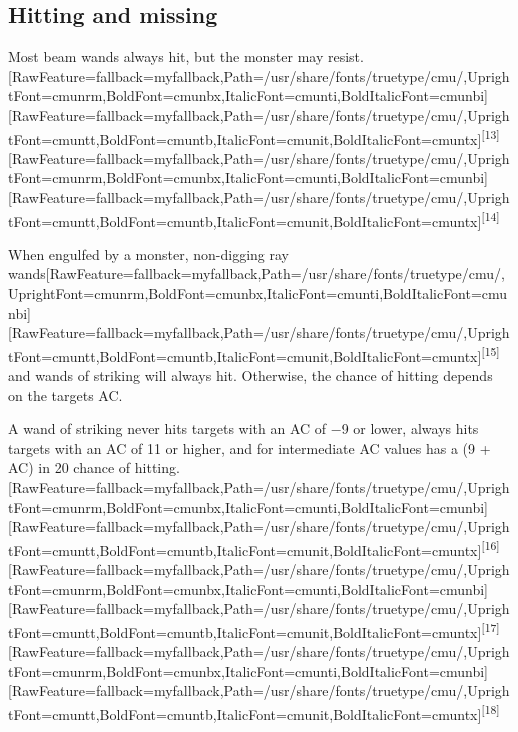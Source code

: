\subsection{Hitting and missing}
\label{6}
Most beam wands always hit, but the monster may resist.\allowbreak{}\setmainfont{cmunrm.ttf}[RawFeature={fallback=myfallback},Path=/usr/share/fonts/truetype/cmu/,UprightFont=cmunrm,BoldFont=cmunbx,ItalicFont=cmunti,BoldItalicFont=cmunbi]\setmonofont{cmunrm.ttf}[RawFeature={fallback=myfallback},Path=/usr/share/fonts/truetype/cmu/,UprightFont=cmuntt,BoldFont=cmuntb,ItalicFont=cmunit,BoldItalicFont=cmuntx]\textsuperscript{{$\text{[}$}13{$\text{]}$}}\allowbreak{}\setmainfont{cmunrm.ttf}[RawFeature={fallback=myfallback},Path=/usr/share/fonts/truetype/cmu/,UprightFont=cmunrm,BoldFont=cmunbx,ItalicFont=cmunti,BoldItalicFont=cmunbi]\setmonofont{cmunrm.ttf}[RawFeature={fallback=myfallback},Path=/usr/share/fonts/truetype/cmu/,UprightFont=cmuntt,BoldFont=cmuntb,ItalicFont=cmunit,BoldItalicFont=cmuntx]\textsuperscript{{$\text{[}$}14{$\text{]}$}}


When engulfed\footnotemark[87] by a monster, non-{}digging ray wands\allowbreak{}\setmainfont{cmunrm.ttf}[RawFeature={fallback=myfallback},Path=/usr/share/fonts/truetype/cmu/,UprightFont=cmunrm,BoldFont=cmunbx,ItalicFont=cmunti,BoldItalicFont=cmunbi]\setmonofont{cmunrm.ttf}[RawFeature={fallback=myfallback},Path=/usr/share/fonts/truetype/cmu/,UprightFont=cmuntt,BoldFont=cmuntb,ItalicFont=cmunit,BoldItalicFont=cmuntx]\textsuperscript{{$\text{[}$}15{$\text{]}$}} and wands of striking will always hit. Otherwise, the chance of hitting depends on the target\textquotesingle{}s AC.


A wand of striking never hits targets with an AC of {\mbox{$-$}}9 or lower, always hits targets with an AC of 11 or higher, and for intermediate AC values has a (9 + AC) in 20 chance of hitting.\allowbreak{}\setmainfont{cmunrm.ttf}[RawFeature={fallback=myfallback},Path=/usr/share/fonts/truetype/cmu/,UprightFont=cmunrm,BoldFont=cmunbx,ItalicFont=cmunti,BoldItalicFont=cmunbi]\setmonofont{cmunrm.ttf}[RawFeature={fallback=myfallback},Path=/usr/share/fonts/truetype/cmu/,UprightFont=cmuntt,BoldFont=cmuntb,ItalicFont=cmunit,BoldItalicFont=cmuntx]\textsuperscript{{$\text{[}$}16{$\text{]}$}}\allowbreak{}\setmainfont{cmunrm.ttf}[RawFeature={fallback=myfallback},Path=/usr/share/fonts/truetype/cmu/,UprightFont=cmunrm,BoldFont=cmunbx,ItalicFont=cmunti,BoldItalicFont=cmunbi]\setmonofont{cmunrm.ttf}[RawFeature={fallback=myfallback},Path=/usr/share/fonts/truetype/cmu/,UprightFont=cmuntt,BoldFont=cmuntb,ItalicFont=cmunit,BoldItalicFont=cmuntx]\textsuperscript{{$\text{[}$}17{$\text{]}$}}\allowbreak{}\setmainfont{cmunrm.ttf}[RawFeature={fallback=myfallback},Path=/usr/share/fonts/truetype/cmu/,UprightFont=cmunrm,BoldFont=cmunbx,ItalicFont=cmunti,BoldItalicFont=cmunbi]\setmonofont{cmunrm.ttf}[RawFeature={fallback=myfallback},Path=/usr/share/fonts/truetype/cmu/,UprightFont=cmuntt,BoldFont=cmuntb,ItalicFont=cmunit,BoldItalicFont=cmuntx]\textsuperscript{{$\text{[}$}18{$\text{]}$}}


